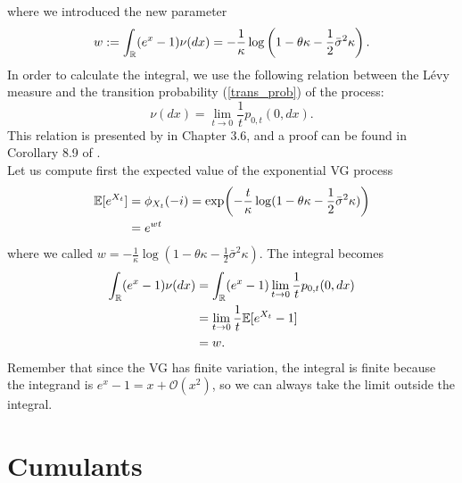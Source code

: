 where we introduced the new parameter
\begin{equation}\label{parameter_w}
 w := \int_{\mathbb{R}} (e^x-1) \nu(dx) = - \frac{1}{\kappa} \log \left( 1-\theta \kappa -\frac{1}{2}\bar\sigma^2 \kappa \right).
\end{equation}
In order to calculate the integral, we use the following relation between the Lévy measure and the transition probability (\ref{trans_prob}) of the process:
\begin{equation}
 \nu(dx) = \lim_{t\to 0} \frac{1}{t} p_{0,t}(0,dx).
\end{equation}
This relation is presented by \cite{Cont} in Chapter 3.6, and a proof can be found in Corollary 8.9 of \cite{Sato}. \\
Let us compute first the expected value of the exponential VG process
\begin{align*}
\mathbb{E}[ e^{X_t}] &= \phi_{X_t}(-i) = \exp \biggl( -\frac{t}{\kappa} \log(1-\theta \kappa -\frac{1}{2}\bar\sigma^2 \kappa ) \biggr)\\
 &= e^{w t}
\end{align*}
where we called $w = - \frac{1}{\kappa} \log(1-\theta \kappa -\frac{1}{2}\bar\sigma^2 \kappa)$.
The integral becomes
\begin{align*}
 \int_{\mathbb{R}} (e^x-1) \nu(dx) &= \int_{\mathbb{R}} (e^x-1) \lim_{t\to 0} \frac{1}{t} p_{0,t}(0,dx) \\ 
         &= \lim_{t\to 0} \frac{1}{t} \mathbb{E}[ e^{X_t} - 1 ] \\
         &= w.
\end{align*}
Remember that since the VG has finite variation, the integral is finite because the integrand is $e^x-1 = x + \mathcal{O}(x^2)$,
so we can always take the limit outside the integral.





\section{Cumulants}\label{cumulant_sec}


